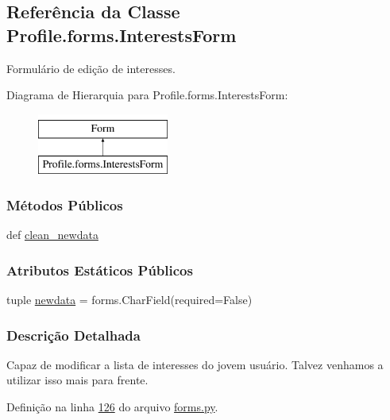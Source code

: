 \hypertarget{classProfile_1_1forms_1_1InterestsForm}{\subsection{Referência da Classe Profile.\-forms.\-Interests\-Form}
\label{classProfile_1_1forms_1_1InterestsForm}
}


Formulário de edição de interesses.  


Diagrama de Hierarquia para Profile.\-forms.\-Interests\-Form\-:\begin{figure}[H]
\begin{center}
\leavevmode
\includegraphics[height=2.000000cm]{d4/d5e/classProfile_1_1forms_1_1InterestsForm}
\end{center}
\end{figure}
\subsubsection*{Métodos Públicos}
\begin{DoxyCompactItemize}
\item 
def \hyperlink{classProfile_1_1forms_1_1InterestsForm_a6422167036a926576b18570db4da5117}{clean\-\_\-newdata}
\end{DoxyCompactItemize}
\subsubsection*{Atributos Estáticos Públicos}
\begin{DoxyCompactItemize}
\item 
tuple \hyperlink{classProfile_1_1forms_1_1InterestsForm_ad400f3a7b43e71bd7772fa85e2961ff0}{newdata} = forms.\-Char\-Field(required=False)
\end{DoxyCompactItemize}


\subsubsection{Descrição Detalhada}
Capaz de modificar a lista de interesses do jovem usuário. Talvez venhamos a utilizar isso mais para frente. 

Definição na linha \hyperlink{Profile_2forms_8py_source_l00126}{126} do arquivo \hyperlink{Profile_2forms_8py_source}{forms.\-py}.



